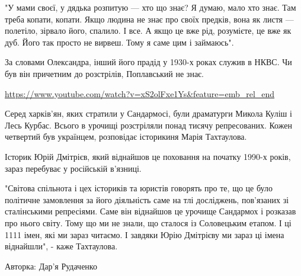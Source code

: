 "У мами своєї, у дядька розпитую — хто що знає? Я думаю, мало хто знає. Там
треба копати, копати. Якщо людина не знає про своїх предків, вона як листя —
полетіло, зірвало його, спалило. І все. А якщо це вже рід, розумієте, це вже як
дуб. Його так просто не вирвеш. Тому я саме цим і займаюсь".

За словами Олександра, інший його прадід у 1930-х роках служив в НКВС. Чи був
він причетним до розстрілів, Поплавський не знає.
 
\url{https://www.youtube.com/watch?v=xS2olFxe1Ys&feature=emb_rel_end}

Серед харків'ян, яких стратили у Сандармосі, були драматурги Микола Куліш і
Лесь Курбас. Всього в урочищі розстріляли понад тисячу репресованих. Кожен
четвертий був українцем, розповідає історикиня Марія Тахтаулова.

Історик Юрій Дмітрієв, який віднайшов це поховання на початку 1990-х років,
зараз перебуває у російській в'язниці.

"Світова спільнота і цех істориків та юристів говорять про те, що це було
політичне замовлення за його діяльність саме на тлі досліджень, пов'язаних зі
сталінськими репресіями. Саме він віднайшов це урочище Сандармох і розказав про
нього світу. Тому що ми не знали, що сталося із Соловецьким етапом. І ці 1111
імен, які ми зараз читаємо. І завдяки Юрію Дмітрієву ми зараз ці імена
віднайшли", - каже Тахтаулова.

Авторка: Дар'я Рудаченко
